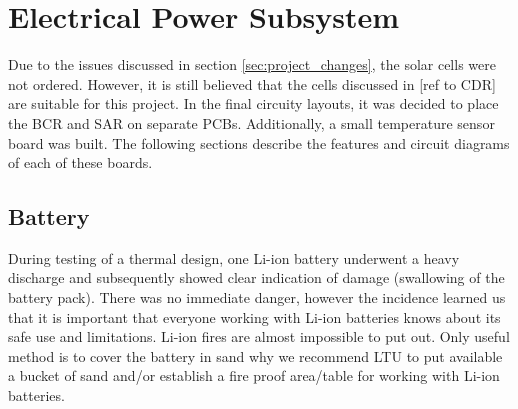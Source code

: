 \section{Electrical Power Subsystem}
%
Due to the issues discussed in section \ref{sec:project_changes}, the solar cells were not ordered. However, it is still believed that the cells discussed in [ref to CDR] are suitable for this project.
%
%
In the final circuity layouts, it was decided to place the \ac{BCR} and \ac{SAR} on separate \acp{PCB}. Additionally, a small temperature sensor board was built. The following sections describe the features and circuit diagrams of each of these boards.
%
%
\subsection{Battery}
%
%
During testing of a thermal design, one Li-ion battery underwent a heavy discharge and subsequently showed clear indication of damage (swallowing of the battery pack). There was no immediate danger, however the incidence learned us that it is important that everyone working with Li-ion batteries knows about its safe use and limitations. Li-ion fires are almost impossible to put out. Only useful method is to cover the battery in sand why we recommend LTU to put available a bucket of sand and/or establish a fire proof area/table for working with Li-ion batteries.
%
%
